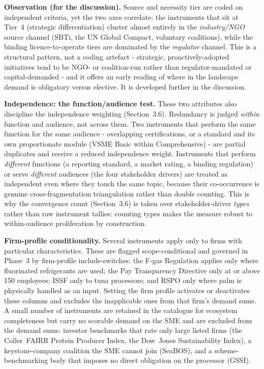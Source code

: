\documentclass[
]{article}
\begin{document}
\textbf{Observation (for the discussion).} Source and necessity tier are
coded on independent criteria, yet the two axes correlate: the
instruments that sit at Tier~4 (strategic differentiation) cluster almost
entirely in the \emph{industry/NGO} source channel (SBTi, the UN Global
Compact, voluntary coalitions), while the binding licence-to-operate
tiers are dominated by the \emph{regulator} channel. This is a structural
pattern, not a coding artefact - strategic, proactively-adopted
initiatives tend to be NGO- or coalition-run rather than
regulator-mandated or capital-demanded - and it offers an early reading
of where in the landscape demand is obligatory versus elective. It is
developed further in the discussion.

\textbf{Independence: the function/audience test.} These two attributes
also discipline the independence weighting (Section~3.6). Redundancy is
judged \emph{within} function and audience, not across them. Two
instruments that perform the same function for the same audience - overlapping certifications, or a standard and its own proportionate module
(VSME Basic within Comprehensive) - are partial duplicates and receive a
reduced independence weight. Instruments that perform \emph{different}
functions (a reporting standard, a market rating, a binding regulation) or
serve \emph{different} audiences (the four stakeholder drivers) are
treated as independent even where they touch the same topic, because their
co-occurrence is genuine cross-fragmentation triangulation rather than
double counting. This is why the convergence count (Section~3.6) is taken
over stakeholder-driver \emph{types} rather than raw instrument tallies:
counting types makes the measure robust to within-audience proliferation
by construction.

\textbf{Firm-profile conditionality.} Several instruments apply only to
firms with particular characteristics. These are flagged
scope-conditional and governed in Phase~3 by firm-profile
include-switches: the F-gas Regulation applies only where fluorinated
refrigerants are used; the Pay Transparency Directive only at or above
150 employees; ISSF only to tuna processors; and RSPO only where palm is
physically handled as an input. Setting the firm profile activates or
deactivates these columns and excludes the inapplicable ones from that
firm's demand sums. A small number of instruments are retained in the
catalogue for ecosystem completeness but carry no scorable demand on the
SME and are excluded from the demand sums: investor benchmarks that rate
only large listed firms (the Coller~FAIRR Protein Producer Index, the
Dow~Jones Sustainability Index), a keystone-company coalition the SME
cannot join (SeaBOS), and a scheme-benchmarking body that imposes no
direct obligation on the processor (GSSI).
\end{document}
